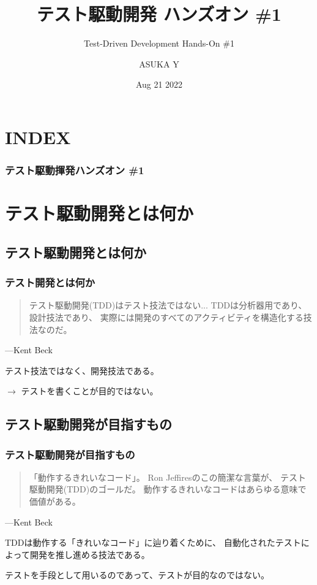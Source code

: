 \documentclass[aspectratio=169]{beamer}
\title{テスト駆動開発 ハンズオン \#1}
\subtitle{Test-Driven Development Hands-On \#1}
\author{ASUKA Y}
\date{Aug 21 2022}
\begin{document}
\begin{frame}
  \titlepage
\end{frame}

\section*{INDEX}
\begin{frame}
  \frametitle{テスト駆動揮発ハンズオン \#1}
  \tableofcontents
\end{frame}

\section{テスト駆動開発とは何か}
\subsection{テスト駆動開発とは何か}
\begin{frame}\frametitle{テスト開発とは何か}
  \begin{quote}
    テスト駆動開発(TDD)はテスト技法ではない...
    TDDは分析器用であり、設計技法であり、
    実際には開発のすべてのアクティビティを構造化する技法なのだ。
  \end{quote}
  \begin{flushright}
    ---Kent Beck
  \end{flushright}

  テスト技法ではなく、開発技法である。

  {
    \large \color{blue}
    $\rightarrow$
    テストを書くことが目的ではない。
  }
\end{frame}

\subsection{テスト駆動開発が目指すもの}
\begin{frame}\frametitle{テスト駆動開発が目指すもの}
  \begin{quote}
    「動作するきれいなコード」。
    Ron Jeffiresのこの簡潔な言葉が、
    テスト駆動開発(TDD)のゴールだ。
    動作するきれいなコードはあらゆる意味で価値がある。
  \end{quote}
  \begin{flushright}
    ---Kent Beck
  \end{flushright}

  TDDは動作する「きれいなコード」に辿り着くために、
  {\color{blue} 自動化されたテストによって開発を推し進める技法}である。

  \begin{center}
    \color{red} \large テストを手段として用いるのであって、テストが目的なのではない。
  \end{center}
\end{frame}
\end{document}

